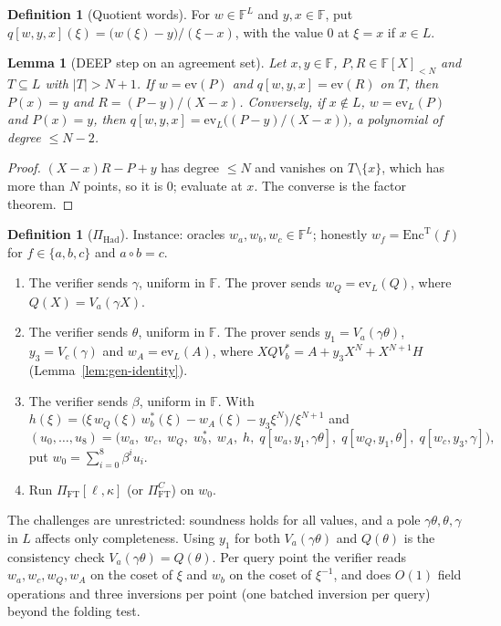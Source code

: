 \documentclass[11pt]{article}
\newtheorem{lemma}[theorem]{Lemma}
\theoremstyle{definition}
\newtheorem{definition}[theorem]{Definition}
\newcommand{\F}{\mathbb{F}}
\newcommand{\ev}{\mathrm{ev}}
\begin{document}
\begin{definition}[Quotient words]
For $w\in\F^L$ and $y,x\in\F$, put $q[w,y,x](\xi)=\bigl(w(\xi)-y\bigr)/(\xi-x)$, with the value $0$ at $\xi=x$ if $x\in L$.
\end{definition}

\begin{lemma}[DEEP step on an agreement set]\label{lem:deep}
Let $x,y\in\F$, $P,R\in\F[X]_{<N}$ and $T\subseteq L$ with $|T|>N+1$.
If $w=\ev(P)$ and $q[w,y,x]=\ev(R)$ on $T$, then $P(x)=y$ and $R=(P-y)/(X-x)$.
Conversely, if $x\notin L$, $w=\ev_L(P)$ and $P(x)=y$, then $q[w,y,x]=\ev_L\bigl((P-y)/(X-x)\bigr)$, a polynomial of degree $\le N-2$.
\end{lemma}
\begin{proof}
$(X-x)R-P+y$ has degree $\le N$ and vanishes on $T\setminus\{x\}$, which has more than $N$ points, so it is $0$; evaluate at $x$.
The converse is the factor theorem.
\end{proof}

\begin{definition}[$\Pi_{\mathrm{Had}}$]\label{def:had}
Instance: oracles $w_a,w_b,w_c\in\F^L$; honestly $w_f=\mathrm{Enc}^{\mathrm T}(f)$ for $f\in\{a,b,c\}$ and $a\circ b=c$.
\begin{enumerate}[nosep]
\item The verifier sends $\gamma$, uniform in $\F$. The prover sends $w_Q=\ev_L(Q)$, where $Q(X)=V_a(\gamma X)$.
\item The verifier sends $\theta$, uniform in $\F$. The prover sends $y_1=V_a(\gamma\theta)$, $y_3=V_c(\gamma)$ and $w_A=\ev_L(A)$, where $XQV_b^\ast=A+y_3X^N+X^{N+1}H$ (Lemma~\ref{lem:gen-identity}).
\item The verifier sends $\beta$, uniform in $\F$. With $h(\xi)=\bigl(\xi\,w_Q(\xi)\,w_b^\ast(\xi)-w_A(\xi)-y_3\xi^N\bigr)/\xi^{N+1}$ and
\[(u_0,\dots,u_8)=\bigl(w_a,\;w_c,\;w_Q,\;w_b^\ast,\;w_A,\;h,\;q[w_a,y_1,\gamma\theta],\;q[w_Q,y_1,\theta],\;q[w_c,y_3,\gamma]\bigr),\]
put $w_0=\sum_{i=0}^8\beta^iu_i$.
\item Run $\Pi_{\mathrm{FT}}[\ell,\kappa]$ (or $\Pi^C_{\mathrm{FT}}$) on $w_0$.
\end{enumerate}
\end{definition}
The challenges are unrestricted: soundness holds for all values, and a pole $\gamma\theta,\theta,\gamma$ in $L$ affects only completeness.
Using $y_1$ for both $V_a(\gamma\theta)$ and $Q(\theta)$ is the consistency check $V_a(\gamma\theta)=Q(\theta)$.
Per query point the verifier reads $w_a,w_c,w_Q,w_A$ on the coset of $\xi$ and $w_b$ on the coset of $\xi^{-1}$, and does $O(1)$ field operations and three inversions per point (one batched inversion per query) beyond the folding test.
\end{document}
